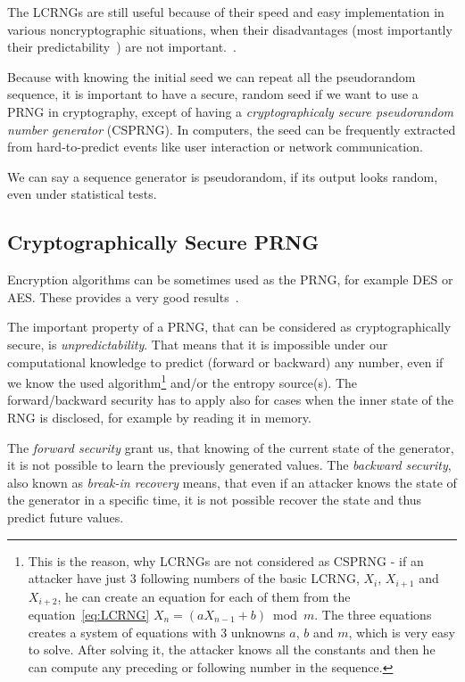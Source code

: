 The LCRNGs are still useful because of their speed and easy implementation in various noncryptographic situations, when their disadvantages (most importantly their predictability~\cite[p.~152, 153]{CryptographyAndNetworkSecurity}) are not important.~\cite[chapter~16.1]{AppliedCryptography}. 

Because with knowing the initial seed we can repeat all the pseudorandom sequence, it is important to have a secure, random seed if we want to use a PRNG in cryptography, except of having a {\em cryptographicaly secure pseudorandom number generator} (CSPRNG). In computers, the seed can be frequently extracted from hard-to-predict events like user interaction or network communication.

We can say a sequence generator is pseudorandom, if its output looks random, even under statistical tests.

\subsection{Cryptographically Secure PRNG}
Encryption algorithms can be sometimes used as the PRNG, for example DES or AES. These provides a very good results~\cite[p.~153-156]{CryptographyAndNetworkSecurity}.

The important property of a PRNG, that can be considered as cryptographically secure, is {\em unpredictability}. That means that it is impossible under our computational knowledge to predict (forward or backward) any number, even if we know the used algorithm\footnote{This is the reason, why LCRNGs are not considered as CSPRNG - if an attacker have just 3 following numbers of the basic LCRNG, $X_{i}$, $X_{i+1}$ and $X_{i+2}$, he can create an equation for each of them from the equation~\ref{eq:LCRNG} $X_n = (aX_{n-1} + b)$~mod~$m$. The three equations creates a system of equations with 3 unknowns $a$, $b$ and $m$, which is very easy to solve. After solving it, the attacker knows all the constants and then he can compute any preceding or following number in the sequence.} and/or the entropy source(s). The forward/backward security has to apply also for cases when the inner state of the RNG is disclosed, for example by reading it in memory.

The {\em forward security} grant us, that knowing of the current state of the generator, it is not possible to learn the previously generated values. The {\em backward security}, also known as {\em break-in recovery}  means, that even if an attacker knows the state of the generator in a specific time, it is not possible recover the state and thus predict future values.

